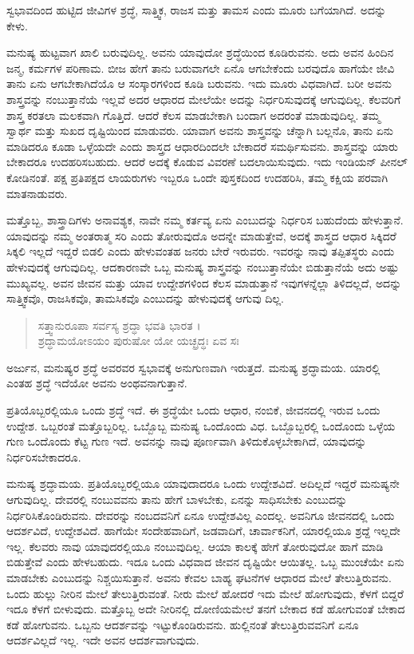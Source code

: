 {\small ಸ್ವಭಾವದಿಂದ ಹುಟ್ಟಿದ ಜೀವಿಗಳ ಶ್ರದ್ಧೆ, ಸಾತ್ತ್ವಿಕ, ರಾಜಸ ಮತ್ತು ತಾಮಸ ಎಂದು ಮೂರು ಬಗೆಯಾಗಿದೆ. ಅದನ್ನು ಕೇಳು.}

ಮನುಷ್ಯ ಹುಟ್ಟವಾಗ ಖಾಲಿ ಬರುವುದಿಲ್ಲ. ಅವನು ಯಾವುದೋ ಶ್ರದ್ಧೆಯಿಂದ ಕೂಡಿರುವನು. ಅದು ಅವನ ಹಿಂದಿನ ಜನ್ಮ, ಕರ್ಮಗಳ ಪರಿಣಾಮ. ಬೀಜ ಹೇಗೆ ತಾನು ಬರುವಾಗಲೇ ಏನೊ ಆಗಬೇಕೆಂದು ಬರವುದೊ ಹಾಗೆಯೇ ಜೀವಿ ತಾನು ಏನು ಆಗಬೇಕಾಗಿದೆಯೊ ಆ ಸಂಸ್ಕಾರಗಳಿಂದ ಕೂಡಿ ಬರುವನು. ಇದು ಮೂರು ವಿಧವಾಗಿದೆ. ಬರೀ ಅವನು ಶಾಸ್ತ್ರವನ್ನು ನಂಬುತ್ತಾನೆಯೆ ಇಲ್ಲವೆ ಅದರ ಆಧಾರದ ಮೇಲೆಯೇ ಅದನ್ನು ನಿರ್ಧರಿಸುವುದಕ್ಕೆ ಆಗುವುದಿಲ್ಲ. ಕೆಲವರಿಗೆ ಶಾಸ್ತ್ರ ಕರತಲಾ ಮಲಕವಾಗಿ ಗೊತ್ತಿದೆ. ಆದರೆ ಕೆಲಸ ಮಾಡಬೇಕಾಗಿ ಬಂದಾಗ ಅದರಂತೆ ಮಾಡುವುದಿಲ್ಲ. ತಮ್ಮ ಸ್ವಾರ್ಥ ಮತ್ತು ಸುಖದ ದೃಷ್ಟಿಯಿಂದ ಮಾಡುವರು. ಯಾವಾಗ ಅವನು ಶಾಸ್ತ್ರವನ್ನು ಚೆನ್ನಾಗಿ ಬಲ್ಲನೊ, ತಾನು ಏನು ಮಾಡಿದರೂ ಕೂಡಾ ಒಳ್ಳೆಯದೇ ಎಂದು ಶಾಸ್ತ್ರದ ಆಧಾರದಿಂದಲೇ ಬೇಕಾದರೆ ಸಮರ್ಥಿಸುವನು. ಶಾಸ್ತ್ರವನ್ನು ಯಾರು ಬೇಕಾದರೂ ಉದಹರಿಸಬಹುದು. ಆದರೆ ಅದಕ್ಕೆ ಕೊಡುವ ವಿವರಣೆ ಬದಲಾಯಿಸುವುದು. ಇದು ಇಂಡಿಯನ್ ಪೀನಲ್ ಕೋಡಿನಂತೆ. ಪಕ್ಷ ಪ್ರತಿಪಕ್ಷದ ಲಾಯರುಗಳು ಇಬ್ಬರೂ ಒಂದೇ ಪುಸ್ತಕದಿಂದ ಉದಹರಿಸಿ, ತಮ್ಮ ಕಕ್ಷಿಯ ಪರವಾಗಿ ಮಾತನಾಡುವರು.

ಮತ್ತೊಬ್ಬ, ಶಾಸ್ತ್ರಾದಿಗಳು ಅನಾವಶ್ಯಕ, ನಾವೇ ನಮ್ಮ ಕರ್ತವ್ಯ ಏನು ಎಂಬುದನ್ನು ನಿರ್ಧರಿಸ ಬಹುದೆಂದು ಹೇಳುತ್ತಾನೆ. ಯಾವುದನ್ನು ನಮ್ಮ ಅಂತರಾತ್ಮ ಸರಿ ಎಂದು ತೋರುವುದೊ ಅದನ್ನೇ ಮಾಡುತ್ತೇವೆ, ಅದಕ್ಕೆ ಶಾಸ್ತ್ರದ ಆಧಾರ ಸಿಕ್ಕಿದರೆ ಸಿಕ್ಕಲಿ ಇಲ್ಲದೆ ಇದ್ದರೆ ಬಿಡಲಿ ಎಂದು ಹೇಳುವಂತಹ ಜನರು ಬೇರೆ ಇರುವರು. ಇವರನ್ನು ನಾವು ತಪ್ಪಿತಸ್ಥರು ಎಂದು ಹೇಳುವುದಕ್ಕೆ ಆಗುವುದಿಲ್ಲ. ಆದಕಾರಣವೇ ಒಬ್ಬ ಮನುಷ್ಯ ಶಾಸ್ತ್ರವನ್ನು ನಂಬುತ್ತಾನೆಯೇ ಬಿಡುತ್ತಾನೆಯೆ ಅದು ಅಷ್ಟು ಮುಖ್ಯವಲ್ಲ. ಅವನ ಜೀವನ ಮತ್ತು ಯಾವ ಉದ್ದೇಶಗಳಿಂದ ಕೆಲಸ ಮಾಡುತ್ತಾನೆ ಇವುಗಳನ್ನೆಲ್ಲಾ ತಿಳಿದಲ್ಲದೆ, ಅದನ್ನು ಸಾತ್ತ್ವಿಕವೊ, ರಾಜಸಿಕವೊ, ತಾಮಸಿಕವೊ ಎಂಬುದನ್ನು ಹೇಳುವುದಕ್ಕೆ ಆಗುವು ದಿಲ್ಲ.

\begin{verse}
ಸತ್ತ್ವಾನುರೂಪಾ ಸರ್ವಸ್ಯ ಶ್ರದ್ಧಾ ಭವತಿ ಭಾರತ ।\\ಶ್ರದ್ಧಾಮಯೋಽಯಂ ಪುರುಷೋ ಯೋ ಯಚ್ಛ್ರದ್ಧಃ ಏವ ಸಃ 
\end{verse}

{\small ಅರ್ಜುನ, ಮನುಷ್ಯರ ಶ್ರದ್ಧೆ ಅವರವರ ಸ್ವಭಾವಕ್ಕೆ ಅನುಗುಣವಾಗಿ ಇರುತ್ತದೆ. ಮನುಷ್ಯ ಶ್ರದ್ಧಾಮಯ. ಯಾರಲ್ಲಿ ಎಂತಹ ಶ್ರದ್ಧೆ ಇದೆಯೋ ಅವನು ಅಂಥವನಾಗುತ್ತಾನೆ.}

ಪ್ರತಿಯೊಬ್ಬರಲ್ಲಿಯೂ ಒಂದು ಶ್ರದ್ಧೆ ಇದೆ. ಈ ಶ್ರದ್ಧೆಯೇ ಒಂದು ಆಧಾರ, ನಂಬಿಕೆ, ಜೀವನದಲ್ಲಿ ಇರುವ ಒಂದು ಉದ್ದೇಶ. ಒಬ್ಬರಂತೆ ಮತ್ತೊಬ್ಬರಿಲ್ಲ. ಒಬ್ಬೊಬ್ಬ ಮನುಷ್ಯ ಒಂದೊಂದು ವಿಧ. ಒಬ್ಬೊಬ್ಬರಲ್ಲಿ ಒಂದೊಂದು ಒಳ್ಳೆಯ ಗುಣ ಒಂದೊಂದು ಕೆಟ್ಟ ಗುಣ ಇದೆ. ಅವನನ್ನು ನಾವು ಪೂರ್ಣವಾಗಿ ತಿಳಿದುಕೊಳ್ಳಬೇಕಾಗಿದೆ, ಯಾವುದನ್ನು ನಿರ್ಧರಿಸಬೇಕಾದರೂ.

ಮನುಷ್ಯ ಶ್ರದ್ಧಾಮಯ. ಪ್ರತಿಯೊಬ್ಬರಲ್ಲಿಯೂ ಯಾವುದಾದರೂ ಒಂದು ಉದ್ದೇಶವಿದೆ. ಅದಿಲ್ಲದೆ ಇದ್ದರೆ ಮನುಷ್ಯನೇ ಆಗುವುದಿಲ್ಲ. ದೇವರಲ್ಲಿ ನಂಬುವವನು ತಾನು ಹೇಗೆ ಬಾಳಬೇಕು, ಏನನ್ನು ಸಾಧಿಸಬೇಕು ಎಂಬುದನ್ನು ನಿರ್ಧರಿಸಿಕೊಂಡಿರುವನು. ದೇವರನ್ನು ನಂಬದವನಿಗೆ ಏನೂ ಉದ್ದೇಶವಿಲ್ಲ ಎಂದಲ್ಲ. ಅವನಿಗೂ ಜೀವನದಲ್ಲಿ ಒಂದು ಆದರ್ಶವಿದೆ, ಉದ್ದೇಶವಿದೆ. ಹಾಗೆಯೇ ಸಂದೇಹವಾದಿಗೆ, ಜಡವಾದಿಗೆ, ಚಾರ್ವಾಕನಿಗೆ, ಯಾರಲ್ಲಿಯೂ ಶ್ರದ್ದೆ ಇಲ್ಲದೇ ಇಲ್ಲ. ಕೆಲವರು ನಾವು ಯಾವುದರಲ್ಲಿಯೂ ನಂಬುವುದಿಲ್ಲ. ಆಯಾ ಕಾಲಕ್ಕೆ ಹೇಗೆ ತೋರುವುದೋ ಹಾಗೆ ಮಾಡಿ ಬಿಡುತ್ತೇವೆ ಎಂದು ಹೇಳಬಹುದು. ಇದೂ ಒಂದು ವಿಧವಾದ ಜೀವನ ದೃಷ್ಟಿಯೇ ಆಯಿತಲ್ಲ. ಒಬ್ಬ ಮುಂಚೆಯೇ ಏನು ಮಾಡಬೇಕು ಎಂಬುದನ್ನು ನಿಶ್ಚಯಿಸುತ್ತಾನೆ. ಅವನು ಕೇವಲ ಬಾಹ್ಯ ಘಟನೆಗಳ ಆಧಾರದ ಮೇಲೆ ತೇಲುತ್ತಿರುವನು. ಒಂದು ಹುಲ್ಲು ನೀರಿನ ಮೇಲೆ ತೇಲುತ್ತಿರುವಂತೆ. ನೀರು ಮೇಲೆ ಹೋದರೆ ಇದು ಮೇಲೆ ಹೋಗುವುದು, ಕೆಳಗೆ ಬಿದ್ದರೆ ಇದೂ ಕೆಳಗೆ ಬೀಳುವುದು. ಮತ್ತೊಬ್ಬ ಅದೇ ನೀರಿನಲ್ಲಿ ದೋಣಿಯಮೇಲೆ ತನಗೆ ಬೇಕಾದ ಕಡೆ ಹೋಗುವಂತೆ ಬೇಕಾದ ಕಡೆ ಹೋಗುವನು. ಒಬ್ಬನು ಆದರ್ಶವನ್ನು ಇಟ್ಟುಕೊಂಡಿರುವನು. ಹುಲ್ಲಿನಂತೆ ತೇಲುತ್ತಿರುವವನಿಗೆ ಏನೂ ಆದರ್ಶವಿಲ್ಲದೆ ಇಲ್ಲ. ಇದೇ ಅವನ ಆದರ್ಶವಾಗುವುದು.

